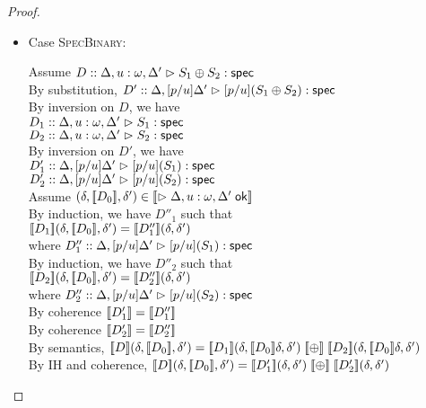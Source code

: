\begin{proof}
\begin{enumerate}
\begin{itemize}
  \item Case \textsc{SpecBinary}: 
    \begin{tabbedproof}
      \oo Assume $D :: \judgeS[{\Delta, u:\omega, \Delta'}]{S_1 \oplus S_2}$ \\
      \oo By substitution, $D' :: \judgeS[{\Delta, [p/u]\Delta'}]{[p/u](S_1 \oplus S_2)}$ \\
      \oo By inversion on $D$, we have \\
      \ooo $D_1 :: \judgeS[{\Delta, u:\omega, \Delta'}]{S_1}$ \\
      \ooo $D_2 :: \judgeS[{\Delta, u:\omega, \Delta'}]{S_2}$ \\
      \oo By inversion on $D'$, we have \\
      \ooo $D'_1 :: \judgeS[{\Delta, [p/u]\Delta'}]{[p/u](S_1)}$ \\
      \ooo $D'_2 :: \judgeS[{\Delta, [p/u]\Delta'}]{[p/u](S_2)}$ \\
      \oo Assume $(\delta, \interp{D_0}, \delta') \in \interp{\judgeACtx{\Delta, u:\omega, \Delta'}}$ \\
      \ooo By induction, we have $D''_1$ such that \\
      \ooox $\interp{D_1}(\delta, \interp{D_0}, \delta') = \interp{D''_1}(\delta, \delta')$ \\
      \ooo where $D''_1 :: \judgeS[{\Delta, [p/u]\Delta'}]{[p/u](S_1)}$ \\
      \ooo By induction, we have $D''_2$ such that \\
      \ooox $\interp{D_2}(\delta, \interp{D_0}, \delta') = \interp{D''_2}(\delta, \delta')$ \\
      \ooo where $D''_2 :: \judgeS[{\Delta, [p/u]\Delta'}]{[p/u](S_2)}$ \\
      \ooo By coherence $\interp{D'_1} = \interp{D''_1}$ \\
      \ooo By coherence $\interp{D'_2} = \interp{D''_2}$ \\
      \ooo By semantics, $\interp{D}(\delta, \interp{D_0}, \delta') = 
                          \interp{D_1}(\delta, \interp{D_0}\delta, \delta') \;\interp{\oplus}\;
                          \interp{D_2}(\delta, \interp{D_0}\delta, \delta')$ \\
      \ooo By IH and coherence, $\interp{D}(\delta, \interp{D_0}, \delta') = 
                          \interp{D'_1}(\delta,\delta') \;\interp{\oplus}\;
                          \interp{D'_2}(\delta,\delta')$ \\
    \end{tabbedproof}


\end{itemize}
\end{enumerate}
\end{proof}
